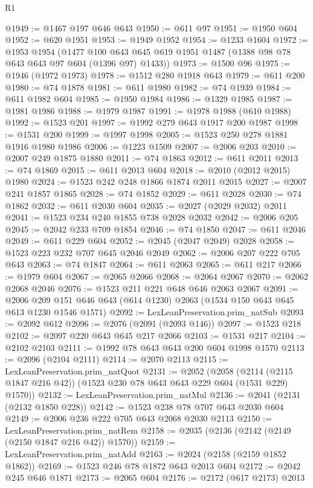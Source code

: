 \begin{lexlean}{R1}
\begin{coremodule}
@1949 := @1467 @197 @646 @643
@1950 := @611 @97
@1951 := @1950 @604
@1952 := @620 @1951
@1953 := @1949 @1952
@1954 := @1233 @1604
@1972 := @1953
    @1954
    (@1477 @100 @643 @645 @619 @1951 @1487 (@1388 @98 @78 @643 @643 @97 @604 (@1396 @97) @1433))
@1973 := @1500 @96
@1975 := @1946 (@1972 @1973)
@1978 := @1512 @280 @1918 @643
@1979 := @611 @200
@1980 := @74 @1878
@1981 := @611 @1980
@1982 := @74 @1939
@1984 := @611 @1982 @604
@1985 := @1950 @1984
@1986 := @1329 @1985
@1987 := @1981 @1986
@1988 := @1979 @1987
@1991 := @1978 @1988 (@610 @1988)
@1992 := @1523 @201
@1997 := @1992 @279 @643 @1917 @200 @1987
@1998 := @1531 @200
@1999 := @1997 @1998
@2005 := @1523 @250 @278 @1881 @1916 @1980 @1986
@2006 := @1223 @1509
@2007 := @2006 @203
@2010 := @2007 @249 @1875 @1880
@2011 := @74 @1863
@2012 := @611 @2011
@2013 := @74 @1869
@2015 := @611 @2013 @604
@2018 := @2010 (@2012 @2015) @1980
@2024 := @1523 @242 @248 @1866 @1874 @2011 @2015
@2027 := @2007 @241 @1857 @1865
@2028 := @74 @1852
@2029 := @611 @2028
@2030 := @74 @1862
@2032 := @611 @2030 @604
@2035 := @2027 (@2029 @2032) @2011
@2041 := @1523 @234 @240 @1855 @738 @2028 @2032
@2042 := @2006 @205
@2045 := @2042 @233 @709 @1854
@2046 := @74 @1850
@2047 := @611 @2046
@2049 := @611 @229 @604
@2052 := @2045 (@2047 @2049) @2028
@2058 := @1523 @223 @232 @707 @645 @2046 @2049
@2062 := @2006 @207 @222 @705 @643
@2063 := @74 @1847
@2064 := @611 @2063
@2065 := @611 @217
@2066 := @1979 @604
@2067 := @2065 @2066
@2068 := @2064 @2067
@2070 := @2062 @2068 @2046
@2076 := @1523 @211 @221 @648 @646 @2063 @2067
@2091 := @2006 @209 @151 @646 @643 (@614 @1230) @2063 (@1534 @150 @643 @645 @613 @1230 @1546 @1571)
@2092 := LexLeanPreservation.prim_natSub
@2093 := @2092 @612
@2096 := @2076 (@2091 (@2093 @146))
@2097 := @1523 @218
@2102 := @2097 @220 @643 @645 @217 @2066
@2103 := @1531 @217
@2104 := @2102 @2103
@2111 := @1992 @78 @643 @643 @200 @604 @1998 @1570
@2113 := @2096 (@2104 @2111)
@2114 := @2070 @2113
@2115 := LexLeanPreservation.prim_natQuot
@2131 := @2052
    (@2058 (@2114 (@2115 @1847 @216 @42)) (@1523 @230 @78 @643 @643 @229 @604 (@1531 @229) @1570))
@2132 := LexLeanPreservation.prim_natMul
@2136 := @2041 (@2131 (@2132 @1850 @228))
@2142 := @1523 @238 @78 @707 @643 @2030 @604
@2149 := @2006 @236 @222 @705 @643 @2068 @2030 @2113
@2150 := LexLeanPreservation.prim_natRem
@2158 := @2035 (@2136 (@2142 (@2149 (@2150 @1847 @216 @42)) @1570))
@2159 := LexLeanPreservation.prim_natAdd
@2163 := @2024 (@2158 (@2159 @1852 @1862))
@2169 := @1523 @246 @78 @1872 @643 @2013 @604
@2172 := @2042 @245 @646 @1871
@2173 := @2065 @604
@2176 := @2172 (@617 @2173) @2013

\end{coremodule}
\end{lexlean}
